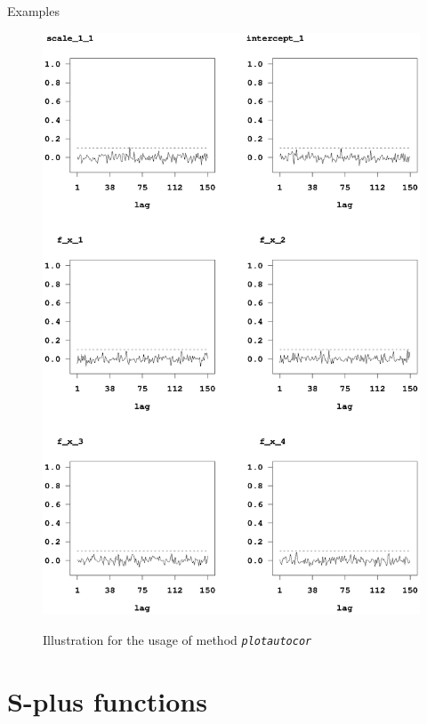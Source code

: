\begin{stanza}{Examples}
\begin{figure}[ht]
\begin{center}
\includegraphics[scale=0.8]{grafiken/autocorexample1.ps}
{\em\caption{ \label{autocorexample} Illustration for the usage of
method \em\texttt{plotautocor}}}
\end{center}
\end{figure}

\end{stanza}

\clearpage

\section{S-plus functions} \label{splus} 

